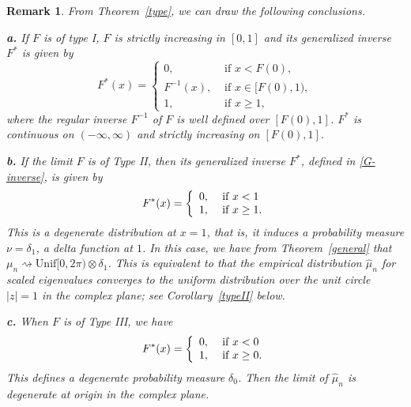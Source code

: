 \documentclass[11pt]{article}
\newtheorem{rem}{\textbf{Remark}}
\numberwithin{equation}{section}
\begin{document}

\vspace{20pt}


\begin{rem}
From Theorem~\ref{type}, we can draw the following conclusions.

 \noindent \textbf{a.} If $F$ is of type I,
 $F$ is strictly increasing in $[0,1]$ and its generalized inverse
$F^*$ is given by
    \begin{equation}\label{case-a}
    F^{*}(x)=
\left\{
\begin{array}{ll}
{0,} &\mbox{ if } x < F(0), \\
{F^{-1}(x),} & \mbox{ if } x \in [F(0),1), \\
{1,} & \mbox{ if } x \geq 1,
\end{array}
\right.
\end{equation}
where the regular inverse $F^{-1}$ of $F$ is well defined over
$[F(0), 1]$. $F^*$ is continuous on $(-\infty, \infty)$ and strictly
increasing on $[F(0),1]$.

\noindent\textbf{b.} If the limit $F$ is of Type II, then its
generalized inverse $F^*$, defined in \eqref{G-inverse}, is given by
\begin{equation}\label{case-b}
F^*(x)=\left\{
      \begin{array}{ll}
        0, & \hbox{ if } x<1 \\
        1, & \hbox{ if } x\ge 1.
      \end{array}
    \right.
\end{equation}
This is a degenerate distribution at $x=1$, that is, it induces a
probability measure $\nu=\delta_1$, a delta function at $1$. In this
case,  we have from Theorem~\ref{general} that $\mu_n
\rightsquigarrow \mathrm{Unif}[0,2 \pi)\otimes \delta_1$.  This is
equivalent to that the empirical distribution $\hat\mu_n$ for scaled
eigenvalues converges to the uniform distribution over the unit
circle $|z|=1$ in the complex plane; see Corollary~\ref{typeII}
below.


\noindent\textbf{c.} When $F$ is of Type III, we have
\begin{equation}\label{case-c}
F^*(x)=\left\{
      \begin{array}{ll}
        0, & \hbox{ if } x<0 \\
        1, & \hbox{ if } x\ge 0.
      \end{array}
    \right.
\end{equation}
This defines a degenerate probability measure $ \delta_0$.  Then the
limit of $\hat\mu_n$ is degenerate at origin in the complex plane.
\end{rem}
\end{document}
